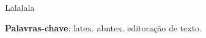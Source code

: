 \setlength{\absparsep}{18pt} %
\begin{resumo}
Lalalala

 \textbf{Palavras-chave}: latex. abntex. editoração de texto.
\end{resumo}
